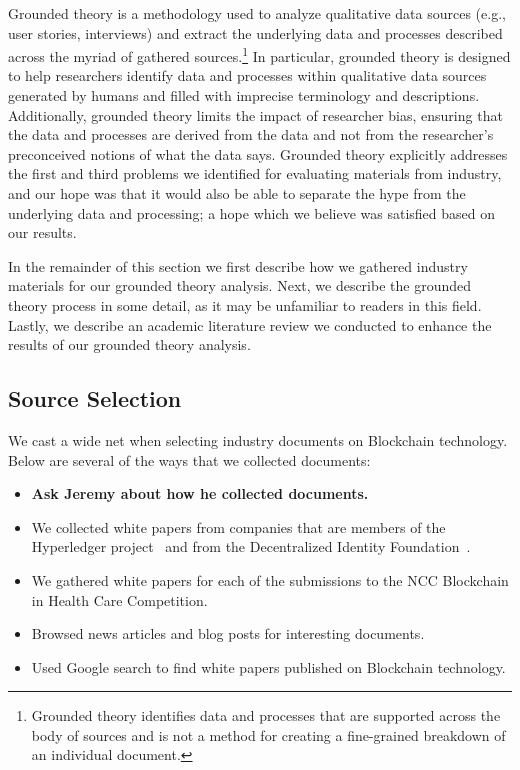 Grounded theory is a methodology used to analyze qualitative data sources (e.g., user stories, interviews) and extract the underlying data and processes described across the myriad of gathered sources.\footnote{Grounded theory identifies data and processes that are supported across the body of sources and is not a method for creating a fine-grained breakdown of an individual document.}
In particular, grounded theory is designed to help researchers identify data and processes within qualitative data sources generated by humans and filled with imprecise terminology and descriptions.
Additionally, grounded theory limits the impact of researcher bias, ensuring that the data and processes are derived from the data and not from the researcher's preconceived notions of what the data says.
Grounded theory explicitly addresses the first and third problems we identified for evaluating materials from industry, and our hope was that it would also be able to separate the hype from the underlying data and processing; a hope which we believe was satisfied based on our results.

In the remainder of this section we first describe how we gathered industry materials for our grounded theory analysis.
Next, we describe the grounded theory process in some detail, as it may be unfamiliar to readers in this field.
Lastly, we describe an academic literature review we conducted to enhance the results of our grounded theory analysis.

\subsection{Source Selection}
We cast a wide net when selecting industry documents on Blockchain technology.
Below are several of the ways that we collected documents:



\begin{itemize}
	\item \textbf{Ask Jeremy about how he collected documents.}
	\item We collected white papers from companies that are members of the Hyperledger project~\cite{hyperledger} and from the Decentralized Identity Foundation~\cite{somethingHere}.
	\item We gathered white papers for each of the submissions to the NCC Blockchain in Health Care Competition.
	\item Browsed news articles and blog posts for interesting documents.
	\item Used Google search to find white papers published on Blockchain technology.
\end{itemize}

